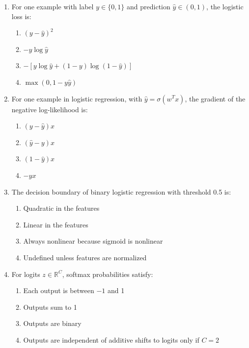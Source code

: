 \documentclass[11pt]{article}
\newcommand{\cmark}{\ding{51}}
\begin{document}
\begin{enumerate}[leftmargin=*]
\item For one example with label $y\in\{0,1\}$ and prediction $\hat y\in(0,1)$, the logistic loss is:

\begin{enumerate}[label=\Alph*.]
    \item $(y-\hat y)^2$
    \item $-y\log \hat y$
    \item $-[y\log \hat y+(1-y)\log(1-\hat y)]$ \cmark
    \item $\max(0,1-y\hat y)$
\end{enumerate}

\item For one example in logistic regression, with $\hat y=\sigma(w^T x)$, the gradient of the negative log-likelihood is:

\begin{enumerate}[label=\Alph*.]
    \item $(y-\hat y)x$
    \item $(\hat y-y)x$ \cmark
    \item $(1-\hat y)x$
    \item $-yx$
\end{enumerate}

\item The decision boundary of binary logistic regression with threshold 0.5 is:

\begin{enumerate}[label=\Alph*.]
    \item Quadratic in the features
    \item Linear in the features \cmark
    \item Always nonlinear because sigmoid is nonlinear
    \item Undefined unless features are normalized
\end{enumerate}

\item For logits $z\in\mathbb R^C$, softmax probabilities satisfy:

\begin{enumerate}[label=\Alph*.]
    \item Each output is between $-1$ and 1
    \item Outputs sum to 1 \cmark
    \item Outputs are binary
    \item Outputs are independent of additive shifts to logits only if $C=2$
\end{enumerate}


\end{enumerate}
\end{document}
